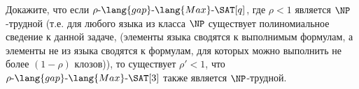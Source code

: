 Докажите, что если $\rho\text{-}\lang{gap}\text{-}\lang{Max}\text{-}\SAT[q]$, где $\rho < 1$ является
$\NP$-трудной (т.е. для любого языка из класса $\NP$ существует полиномиальное сведение к данной задаче,
(элементы языка сводятся к выполнимым формулам, а элементы не из языка сводятся к формулам, для которых
можно выполнить не более $(1 - \rho)$ клозов)), то существует $\rho' < 1$, что
$\rho\text{-}\lang{gap}\text{-}\lang{Max}\text{-}\SAT[3]$ также является $\NP$-трудной.
